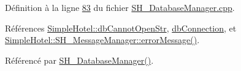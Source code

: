 Définition à la ligne \hyperlink{SH__DatabaseManager_8cpp_source_l00083}{83} du fichier \hyperlink{SH__DatabaseManager_8cpp_source}{S\-H\-\_\-\-Database\-Manager.\-cpp}.



Références \hyperlink{namespaceSimpleHotel_a432df3653afae1e72d3e6ce1cbbb7a63}{Simple\-Hotel\-::db\-Cannot\-Open\-Str}, \hyperlink{classSimpleHotel_1_1SH__DatabaseManager_a01130ad218e0a00e80f53c4894996d19}{db\-Connection}, et \hyperlink{classSimpleHotel_1_1SH__MessageManager_a77bc12a66f3eaa8f3668d8197c0b8f6d}{Simple\-Hotel\-::\-S\-H\-\_\-\-Message\-Manager\-::error\-Message()}.



Référencé par \hyperlink{classSimpleHotel_1_1SH__DatabaseManager_ade00a085fdf7207d67476179e179d03d}{S\-H\-\_\-\-Database\-Manager()}.


